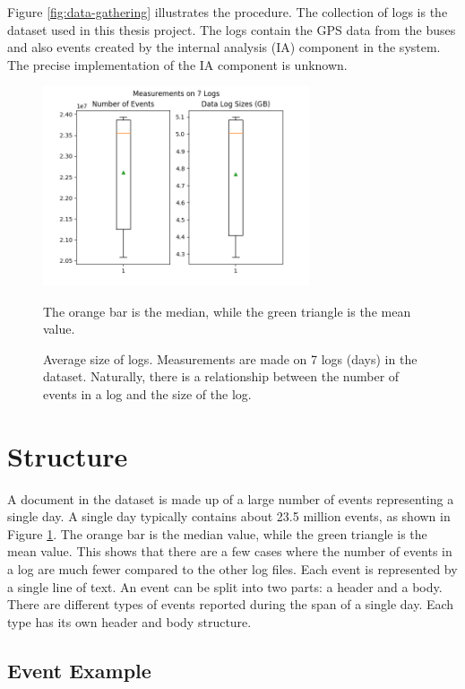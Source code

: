 Figure \ref{fig:data-gathering} illustrates the procedure.
The collection of logs is the dataset used in this thesis project.
The logs contain the GPS data from the buses and also events created by the internal analysis (IA) component in the system.
The precise implementation of the IA component is unknown.

\begin{figure}[ht!]
    \centering
    \includegraphics[width=0.7\textwidth]{figures/log_sizes}
    \caption[Average size of logs]
    {\small Average size of logs.
    Measurements are made on 7 logs (days) in the dataset.
    Naturally, there is a relationship between the number of events in a log and the size of the log.}
    The orange bar is the median, while the green triangle is the mean value.
    \label{fig:log-sizes}
\end{figure}

\section{Structure} \label{sec:data-structure}
A document in the dataset is made up of a large number of events representing a single day.
A single day typically contains about 23.5 million events, as shown in Figure \ref{fig:log-sizes}.
The orange bar is the median value, while the green triangle is the mean value.
This shows that there are a few cases where the number of events in a log are much fewer compared to the other log files.
Each event is represented by a single line of text.
An event can be split into two parts: a header and a body.
There are different types of events reported during the span of a single day.
Each type has its own header and body structure.

\subsection{Event Example}

